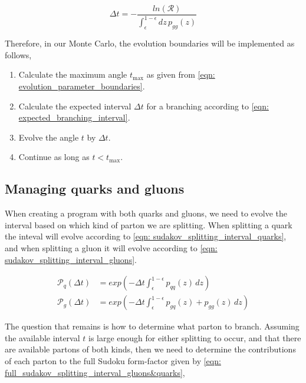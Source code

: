 \documentclass[main.tex]{subfiles}
\begin{document}

\begin{equation}\label{eqn: expected_branching_interval}
    \Delta t = -\frac{ln(\mathcal{R})}{ \int_\epsilon^{1-\epsilon}dz \, p_{gg}(z)} 
\end{equation}

Therefore, in our Monte Carlo, the evolution boundaries will be implemented as follows, 

\begin{enumerate}
    \item Calculate the maximum angle \(t_{\text{max}}\) as given from \autoref{eqn: evolution_parameter_boundaries}.
    \item Calculate the expected interval \(\Delta t\) for a branching according to \autoref{eqn: expected_branching_interval}.
    \item Evolve the angle \(t\) by \(\Delta t\).
    \item Continue as long as \(t< t_{\text{max}}\). 
\end{enumerate}

\subsection{Managing quarks and gluons}\label{sec: managing_quarks_and_gluons}
When creating a program with both quarks and gluons, we need to evolve the interval based on which kind of parton we are splitting. When splitting a quark the inteval will evolve according to \autoref{eqn: sudakov_splitting_interval_quarks}, and when splitting a gluon it will evolve according to \autoref{eqn: sudakov_splitting_interval_gluons}.

\begin{align}
    \mathcal{P}_{q}(\Delta t) &= exp\left(-\Delta t \int_\epsilon^{1-\epsilon} p_{qq}(z) \, dz \right) \label{eqn: sudakov_splitting_interval_quarks}\\
    \mathcal{P}_{g}(\Delta t) &= exp\left(-\Delta t \int_\epsilon^{1-\epsilon} p_{gq}(z) + p_{gg}(z) \, dz \right)  \label{eqn: sudakov_splitting_interval_gluons}  
\end{align}

The question that remains is how to determine what parton to branch. Assuming the available interval \(t\) is large enough for either splitting to occur, and that there are available partons of both kinds, then we need to determine the contributions of each parton to the full Sudoku form-factor given by \autoref{eqn: full_sudakov_splitting_interval_gluons&quarks},
\end{document}
